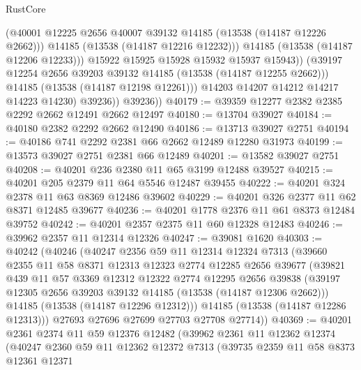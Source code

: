 \begin{lexlean}{RustCore}
\begin{coremodule}
                        (@40001 @12225 @2656 @40007 @39132 @14185 (@13538 (@14187 @12226 @2662)))
                        @14185
                        (@13538 (@14187 @12216 @12232)))
                      @14185
                      (@13538 (@14187 @12206 @12233)))
                    @15922
                    @15925
                    @15928
                    @15932
                    @15937
                    @15943))
                (@39197 @12254 @2656 @39203 @39132 @14185 (@13538 (@14187 @12255 @2662)))
                @14185
                (@13538 (@14187 @12198 @12261)))
              @14203
              @14207
              @14212
              @14217
              @14223
              @14230)
            @39236))
        @39236))
@40179 := @39359 @12277 @2382 @2385 @2292 @2662 @12491 @2662 @12497
@40180 := @13704 @39027
@40184 := @40180 @2382 @2292 @2662 @12490
@40186 := @13713 @39027 @2751
@40194 := @40186 @741 @2292 @2381 @66 @2662 @12489 @12280 @31973
@40199 := @13573 @39027 @2751 @2381 @66 @12489
@40201 := @13582 @39027 @2751
@40208 := @40201 @236 @2380 @11 @65 @3199 @12488 @39527
@40215 := @40201 @205 @2379 @11 @64 @5546 @12487 @39455
@40222 := @40201 @324 @2378 @11 @63 @8369 @12486 @39602
@40229 := @40201 @326 @2377 @11 @62 @8371 @12485 @39677
@40236 := @40201 @1778 @2376 @11 @61 @8373 @12484 @39752
@40242 := @40201 @2357 @2375 @11 @60 @12328 @12483
@40246 := @39962 @2357 @11 @12314 @12326
@40247 := @39081 @1620
@40303 := @40242
    (@40246
      (@40247
        @2356
        @59
        @11
        @12314
        @12324
        @7313
        (@39660
          @2355
          @11
          @58
          @8371
          @12313
          @12323
          @2774
          @12285
          @2656
          @39677
          (@39821
            @439
            @11
            @57
            @3369
            @12312
            @12322
            @2774
            @12295
            @2656
            @39838
            (@39197 @12305 @2656 @39203 @39132 @14185 (@13538 (@14187 @12306 @2662)))
            @14185
            (@13538 (@14187 @12296 @12312)))
          @14185
          (@13538 (@14187 @12286 @12313)))
        @27693
        @27696
        @27699
        @27703
        @27708
        @27714))
@40369 := @40201
    @2361
    @2374
    @11
    @59
    @12376
    @12482
    (@39962
      @2361
      @11
      @12362
      @12374
      (@40247
        @2360
        @59
        @11
        @12362
        @12372
        @7313
        (@39735
          @2359
          @11
          @58
          @8373
          @12361
          @12371

\end{coremodule}
\end{lexlean}
